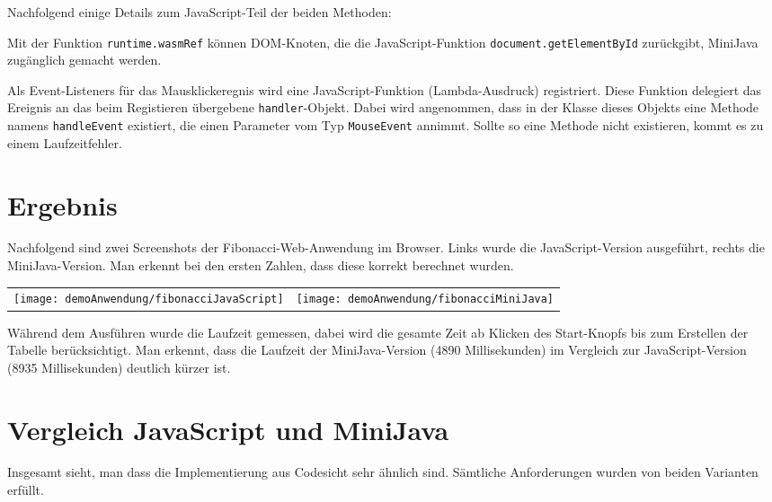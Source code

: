 


Nachfolgend einige Details zum JavaScript-Teil der beiden Methoden:

Mit der Funktion \lstinline{runtime.wasmRef} können DOM-Knoten, die die JavaScript-Funktion \lstinline{document.getElementById} zurückgibt, MiniJava zugänglich gemacht werden.

Als Event-Listeners für das Mausklickeregnis wird eine JavaScript-Funktion (Lambda-Aus\-druck) registriert. Diese Funktion delegiert das Ereignis an das beim Registieren übergebene \lstinline{handler}-Objekt. Dabei wird angenommen, dass in der Klasse dieses Objekts eine Methode namens \lstinline{handleEvent} existiert, die einen Parameter vom Typ \lstinline{MouseEvent} annimmt. Sollte so eine Methode nicht existieren, kommt es zu einem Laufzeitfehler.

\section{Ergebnis}

Nachfolgend sind zwei Screenshots der Fibonacci-Web-Anwendung im Browser. Links wurde die JavaScript-Version ausgeführt, rechts die MiniJava-Version. Man erkennt bei den ersten Zahlen, dass diese korrekt berechnet wurden.

\begin{center}
    \begin{tabular}{c c}
        \texttt{[image: demoAnwendung/fibonacciJavaScript]} & \texttt{[image: demoAnwendung/fibonacciMiniJava]}
    \end{tabular}
\end{center}

Während dem Ausführen wurde die Laufzeit gemessen, dabei wird die gesamte Zeit ab Klicken des Start-Knopfs bis zum Erstellen der Tabelle berücksichtigt. Man erkennt, dass die Laufzeit der MiniJava-Version (4890 Millisekunden) im Vergleich zur JavaScript-Version (8935 Millisekunden) deutlich kürzer ist.

\section{Vergleich JavaScript und MiniJava}

Insgesamt sieht, man dass die Implementierung aus Codesicht sehr ähnlich sind. Sämtliche Anforderungen wurden von beiden Varianten erfüllt.

